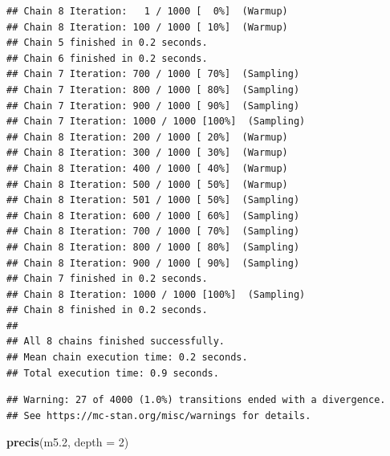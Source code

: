 \documentclass[
]{book}
\newenvironment{Shaded}{\begin{snugshade}}{\end{snugshade}}
\newcommand{\AttributeTok}[1]{\textcolor[rgb]{0.13,0.29,0.53}{#1}}
\newcommand{\DecValTok}[1]{\textcolor[rgb]{0.00,0.00,0.81}{#1}}
\newcommand{\FloatTok}[1]{\textcolor[rgb]{0.00,0.00,0.81}{#1}}
\newcommand{\FunctionTok}[1]{\textcolor[rgb]{0.13,0.29,0.53}{\textbf{#1}}}
\newcommand{\NormalTok}[1]{#1}
\begin{document}
\begin{verbatim}
## Chain 8 Iteration:   1 / 1000 [  0%]  (Warmup) 
## Chain 8 Iteration: 100 / 1000 [ 10%]  (Warmup) 
## Chain 5 finished in 0.2 seconds.
## Chain 6 finished in 0.2 seconds.
## Chain 7 Iteration: 700 / 1000 [ 70%]  (Sampling) 
## Chain 7 Iteration: 800 / 1000 [ 80%]  (Sampling) 
## Chain 7 Iteration: 900 / 1000 [ 90%]  (Sampling) 
## Chain 7 Iteration: 1000 / 1000 [100%]  (Sampling) 
## Chain 8 Iteration: 200 / 1000 [ 20%]  (Warmup) 
## Chain 8 Iteration: 300 / 1000 [ 30%]  (Warmup) 
## Chain 8 Iteration: 400 / 1000 [ 40%]  (Warmup) 
## Chain 8 Iteration: 500 / 1000 [ 50%]  (Warmup) 
## Chain 8 Iteration: 501 / 1000 [ 50%]  (Sampling) 
## Chain 8 Iteration: 600 / 1000 [ 60%]  (Sampling) 
## Chain 8 Iteration: 700 / 1000 [ 70%]  (Sampling) 
## Chain 8 Iteration: 800 / 1000 [ 80%]  (Sampling) 
## Chain 8 Iteration: 900 / 1000 [ 90%]  (Sampling) 
## Chain 7 finished in 0.2 seconds.
## Chain 8 Iteration: 1000 / 1000 [100%]  (Sampling) 
## Chain 8 finished in 0.2 seconds.
## 
## All 8 chains finished successfully.
## Mean chain execution time: 0.2 seconds.
## Total execution time: 0.9 seconds.
\end{verbatim}

\begin{verbatim}
## Warning: 27 of 4000 (1.0%) transitions ended with a divergence.
## See https://mc-stan.org/misc/warnings for details.
\end{verbatim}

\begin{Shaded}
\begin{Highlighting}[]
\FunctionTok{precis}\NormalTok{(m5}\FloatTok{.2}\NormalTok{, }\AttributeTok{depth =} \DecValTok{2}\NormalTok{)}
\end{Highlighting}
\end{Shaded}
\end{document}
